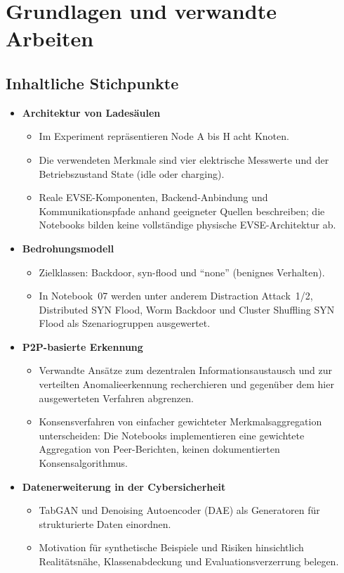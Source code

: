 \section{Grundlagen und verwandte Arbeiten}
\label{sec:related-work}

\subsection{Inhaltliche Stichpunkte}
\begin{itemize}
  \item \textbf{Architektur von Ladesäulen}
  \begin{itemize}
    \item Im Experiment repräsentieren Node A bis H acht Knoten.
    \item Die verwendeten Merkmale sind vier elektrische Messwerte und der
          Betriebszustand State (idle oder charging).
    \item Reale EVSE-Komponenten, Backend-Anbindung und Kommunikationspfade
          anhand geeigneter Quellen beschreiben; die Notebooks bilden keine
          vollständige physische EVSE-Architektur ab.
  \end{itemize}
  \item \textbf{Bedrohungsmodell}
  \begin{itemize}
    \item Zielklassen: Backdoor, syn-flood und ``none'' (benignes Verhalten).
    \item In Notebook~07 werden unter anderem Distraction Attack~1/2,
          Distributed SYN Flood, Worm Backdoor und Cluster Shuffling SYN Flood
          als Szenariogruppen ausgewertet.
  \end{itemize}
  \item \textbf{P2P-basierte Erkennung}
  \begin{itemize}
    \item Verwandte Ansätze zum dezentralen Informationsaustausch und zur
          verteilten Anomalieerkennung recherchieren und gegenüber dem
          hier ausgewerteten Verfahren abgrenzen.
    \item Konsensverfahren von einfacher gewichteter Merkmalsaggregation
          unterscheiden: Die Notebooks implementieren eine gewichtete
          Aggregation von Peer-Berichten, keinen dokumentierten
          Konsensalgorithmus.
  \end{itemize}
  \item \textbf{Datenerweiterung in der Cybersicherheit}
  \begin{itemize}
    \item TabGAN und Denoising Autoencoder (DAE) als Generatoren für
          strukturierte Daten einordnen.
    \item Motivation für synthetische Beispiele und Risiken hinsichtlich
          Realitätsnähe, Klassenabdeckung und Evaluationsverzerrung belegen.
  \end{itemize}
\end{itemize}

